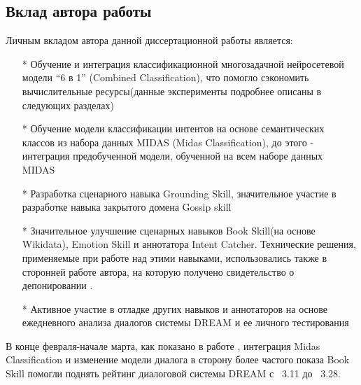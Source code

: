 \subsection{Вклад автора работы}
Личным вкладом автора данной диссертационной работы является:
\begin{itemize}
\item[*] Обучение и интеграция классификационной многозадачной нейросетевой модели “6 в 1” (Combined Classification), что помогло сэкономить вычислительные ресурсы(данные эксперименты подробнее описаны в следующих разделах)
\item[*] Обучение модели классификации интентов на основе семантических классов из набора данных MIDAS (Midas Classification), до этого - интеграция предобученной модели, обученной на всем наборе данных MIDAS
\item[*] Разработка сценарного навыка Grounding Skill, значительное участие в разработке навыка закрытого домена Gossip skill
\item[*] Значительное улучшение сценарных навыков Book Skill(на основе Wikidata), Emotion Skill и аннотатора Intent Catcher. Технические решения, применяемые при работе над этими навыками, использовались также в сторонней работе автора, на которую получено свидетельство о депонировании \cite{Дуплякин_Дмитрий_Ондар_Ушаков_2021}.
\item[*] Активное участие в отладке других навыков и аннотаторов на основе ежедневного анализа диалогов системы DREAM и ее личного тестирования
\end{itemize}

В конце февраля-начале марта, как показано  в работе \cite{dream2}, интеграция Midas Classification и изменение модели диалога в сторону более частого показа Book Skill помогли поднять рейтинг диалоговой системы DREAM с ~3.11 до ~3.28. 

